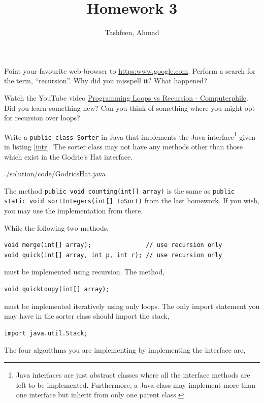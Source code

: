 \documentclass{homework}
\author{Tashfeen, Ahmad}
\title{Homework 3}
\begin{document}
 \maketitle

\question Point your favourite web-browser to \url{https:www.google.com}. Perform a search for the term, ``recursion''. Why did you misspell it? What happened?

\question\label{vid} Watch the YouTube video \href{https://www.youtube.com/watch?v=HXNhEYqFo0o}{Programming Loops vs Recursion - Computerphile}. Did you learn something new? Can you think of something where you might opt for recursion over loops?

\question Write a \texttt{public class Sorter} in Java that implements the Java interface\footnote{Java interfaces are just abstract classes where all the interface methods are left to be implemented. Furthermore, a Java class may implement more than one interface but inherit from only one parent class.} given in listing \ref{intr}. The sorter class may not have any methods other than those which exist in the Godric's Hat interface.


{./solution/code/GodricsHat.java}

The method \texttt{public void counting(int[] array)} is the same as \texttt{public static void sortIntegers(int[] toSort)} from the last homework. If you wish, you may use the implementation from there.

While the following two methods,

\begin{verbatim}
void merge(int[] array);               // use recursion only
void quick(int[] array, int p, int r); // use recursion only
\end{verbatim}

must be implemented using recursion. The method,

\begin{verbatim}
void quickLoopy(int[] array);
\end{verbatim}

must be implemented iteratively \ie using only loops. The only import statement you may have in the sorter class should import the stack,

\begin{verbatim}
import java.util.Stack;
\end{verbatim}

The four algorithms you are implementing by implementing the interface are,
\end{document}
